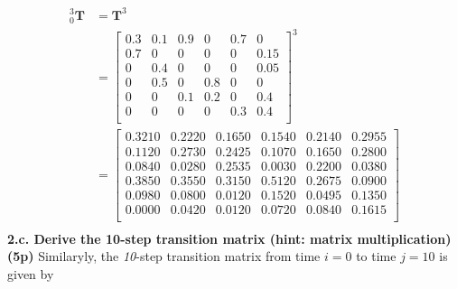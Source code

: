 \documentclass[a4paper,10pt]{article}
\newcommand{\mattrans}[2]{{\ensuremath{{_{#1}^{#2}}{\mathbf{T}}}}}
\begin{document}
\begin{equation*}
\begin{split}
\mattrans{0}{3} &= \mathbf{T}^{3}\\
&= {\left[\begin{array}{cccccc}
0.3 & 0.1 & 0.9 & 0 & 0.7 & 0 \\
0.7 & 0 & 0 & 0 & 0 & 0.15 \\
0 & 0.4 & 0 & 0 & 0 & 0.05 \\
0 & 0.5 & 0 & 0.8 & 0 & 0 \\
0 & 0 & 0.1 & 0.2 & 0 & 0.4 \\
0 & 0 & 0 & 0 & 0.3 & 0.4 \\
\end{array}\right]}^{3}\\
&= \boxed{\left[\begin{array}{cccccc}
0.3210 & 0.2220 & 0.1650 & 0.1540 & 0.2140 & 0.2955\\
0.1120 & 0.2730 & 0.2425 & 0.1070 & 0.1650 & 0.2800\\
0.0840 & 0.0280 & 0.2535 & 0.0030 & 0.2200 & 0.0380\\
0.3850 & 0.3550 & 0.3150 & 0.5120 & 0.2675 & 0.0900\\
0.0980 & 0.0800 & 0.0120 & 0.1520 & 0.0495 & 0.1350\\
0.0000 & 0.0420 & 0.0120 & 0.0720 & 0.0840 & 0.1615\\
\end{array}\right]}\\
\end{split} 
\end{equation*}
\newline\noindent\newline\noindent
\textbf{2.c. Derive the 10-step transition matrix (hint: matrix multiplication) (5p)}
\newline\noindent\newline\noindent
Similaryly, the \emph{10}-step transition matrix from time $i=0$ to time $j=10$ is given by
\newline\noindent\newline\noindent
\end{document}
